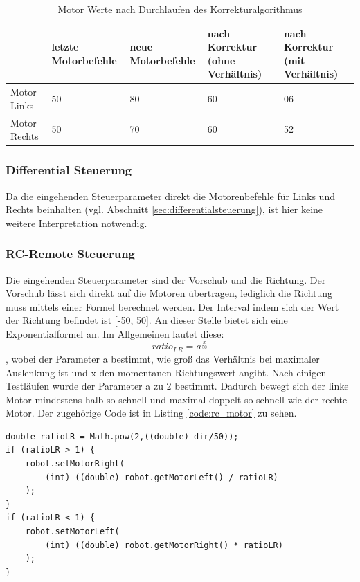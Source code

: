 \vspace{1cm}

\begin{table}[h!]
	\begin{tabularx}{\textwidth}{|X|X|X|X|X|}
		\hline
		 & letzte Motorbefehle & neue Motorbefehle & nach Korrektur (ohne Verhältnis) & nach Korrektur (mit Verhältnis) \\ \hline
		Motor Links      & 50      & 80      & 60      &
		06  \\
		Motor Rechts      & 50      & 70      & 60
		& 52 \\ \hline
	\end{tabularx}
	\caption{Motor Werte nach Durchlaufen des Korrekturalgorithmus}
	\label{tab:bsp_korrektur}
\end{table}



\subsubsection{Differential Steuerung}
Da die eingehenden Steuerparameter direkt die Motorenbefehle für Links und Rechts beinhalten (vgl. Abschnitt \ref{sec:differentialsteuerung}), ist hier keine weitere Interpretation notwendig. 

\subsubsection{RC-Remote Steuerung}
\label{sec:rcremote_server}
Die eingehenden Steuerparameter sind der Vorschub und die Richtung. Der Vorschub lässt sich direkt auf die Motoren übertragen, lediglich die Richtung muss mittels einer Formel berechnet werden. Der Interval indem sich der Wert der Richtung befindet ist [-50, 50]. An dieser Stelle bietet sich eine Exponentialformel an. 
Im Allgemeinen lautet diese: 
{\Large \[ratio_{LR} = a^{\frac{x}{50}}\]},
wobei der Parameter a bestimmt, wie groß das Verhältnis bei maximaler Auslenkung ist und x den momentanen Richtungswert angibt.
Nach einigen Testläufen wurde der Parameter a zu 2 bestimmt. Dadurch bewegt sich der linke Motor mindestens halb so schnell und maximal doppelt so schnell wie der rechte Motor. Der zugehörige Code ist in Listing \ref{code:rc_motor} zu sehen.

\begin{lstlisting}[captionpos = b, caption=Umrechnung der RC Parameter in Motorbefehle, label = code:rc_motor]
double ratioLR = Math.pow(2,((double) dir/50));
if (ratioLR > 1) {
	robot.setMotorRight(
		(int) ((double) robot.getMotorLeft() / ratioLR)
	); 
}
if (ratioLR < 1) {
	robot.setMotorLeft(
		(int) ((double) robot.getMotorRight() * ratioLR)
	);
}
\end{lstlisting}


